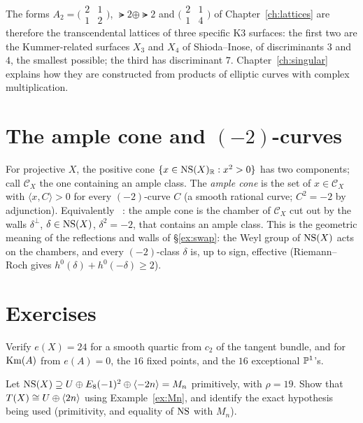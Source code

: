 The forms $A_2=\bigl(\begin{smallmatrix}2&1\\1&2\end{smallmatrix}\bigr)$,
$\lat2\oplus\lat2$ and $\bigl(\begin{smallmatrix}2&1\\1&4\end{smallmatrix}\bigr)$
of Chapter~\ref{ch:lattices} are therefore the transcendental lattices of
three specific K3 surfaces: the first two are the Kummer-related surfaces
$X_3$ and $X_4$ of Shioda--Inose, of discriminants $3$ and $4$, the smallest
possible; the third has discriminant $7$. Chapter~\ref{ch:singular} explains
how they are constructed from products of elliptic curves with complex
multiplication.

\section{The ample cone and $(-2)$-curves}

For projective $X$, the positive cone
$\{x\in\operatorname{NS}(X)_{\mathbb{R}}:x^2>0\}$ has two components; call $\mathcal C_X$ the one
containing an ample class. The \emph{ample cone} is the set of $x\in\mathcal C_X$
with $\langle x,C\rangle>0$ for every $(-2)$-curve $C$ (a smooth rational
curve; $C^2=-2$ by adjunction). Equivalently \Lstatus~\cite[Cor.~8.1.6]{Huybrechts2016}:
the ample cone is the chamber of $\mathcal C_X$ cut out by the walls
$\delta^{\perp}$, $\delta\in\operatorname{NS}(X)$, $\delta^2=-2$, that contains an ample
class. This is the geometric meaning of the reflections and walls of
\S\ref{ex:swap}: the Weyl group of $\operatorname{NS}(X)$ acts on the chambers, and every
$(-2)$-class $\delta$ is, up to sign, effective (Riemann--Roch gives
$h^0(\delta)+h^0(-\delta)\ge2$).

\section{Exercises}

\begin{exercise}
Verify $e(X)=24$ for a smooth quartic from $c_2$ of the tangent bundle, and
for $\operatorname{Km}(A)$ from $e(A)=0$, the $16$ fixed points, and the $16$ exceptional
$\mathbb{P}^1$'s.
\end{exercise}

\begin{exercise}[$\star$]
Let $\operatorname{NS}(X)\supseteq U\oplus E_8(-1)^2\oplus\langle -2n\rangle=M_n$ primitively, with
$\rho=19$. Show that $T(X)\cong U\oplus\langle 2n\rangle$ using Example~\ref{ex:Mn},
and identify the exact hypothesis being used (primitivity, and equality of
$\operatorname{NS}$ with $M_n$).
\end{exercise}

